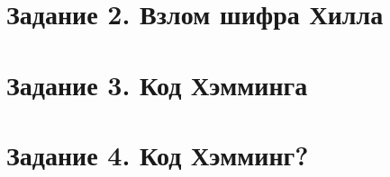 \documentclass[a5paper, 10pt]{article}
\theoremstyle{definition}
\theoremstyle{plain}
\theoremstyle{remark}
\begin{document}
\section{Задание 2. Взлом шифра Хилла}	

\section{Задание 3. Код Хэмминга}

\section{Задание 4. Код Хэмминг?}
\end{document}
